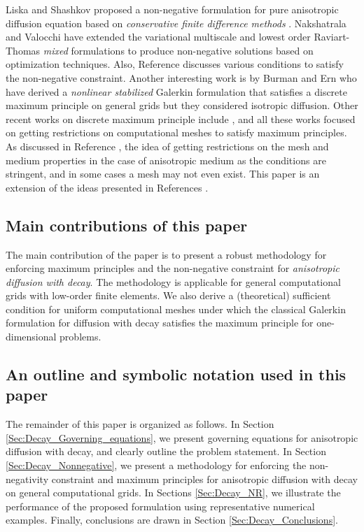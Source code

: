 \documentclass[11pt]{amsart}
\begin{document}
Liska and Shashkov \cite{Liska_Shashkov_CiCP_2008_v3_p852} proposed a non-negative formulation 
for pure anisotropic diffusion equation based on \emph{conservative finite difference methods} \cite{Shashkov}. 
Nakshatrala and Valocchi \cite{Nakshatrala_Valocchi_JCP_2009_v228_p6726} have extended the variational 
multiscale and lowest order Raviart-Thomas \emph{mixed} formulations to produce non-negative solutions 
based on optimization techniques. Also, Reference \cite[Appendix]{Nakshatrala_Valocchi_JCP_2009_v228_p6726} 
discusses various conditions to satisfy the non-negative constraint. Another interesting work is by Burman and 
Ern \cite{Burman_Ern_CRM_2004_v338_p641} who have derived a \emph{nonlinear stabilized} Galerkin 
formulation that satisfies a discrete maximum principle on general grids but they considered isotropic diffusion. 
Other recent works on discrete maximum principle include \cite{Korotov_Krizek_Neittaanmaki_MathComp_2000_v70_p107,
Vanselow_AppMath_2001_v46_p13,Karatson_Korotov_NumerMath_2005_v99_p669,
Karatson_Korotov_JCAM_2006_v192_p75}, and all these works 
focused on getting restrictions on computational meshes to satisfy maximum principles. As discussed 
in Reference \cite{Nakshatrala_Valocchi_JCP_2009_v228_p6726}, the idea of getting restrictions on 
the mesh and medium properties in the case of anisotropic medium as the conditions are stringent, 
and in some cases a mesh may not even exist. 
This paper is an extension of the ideas presented in References 
\cite{Nakshatrala_Valocchi_JCP_2009_v228_p6726,Liska_Shashkov_CiCP_2008_v3_p852}.

\subsection{Main contributions of this paper}
The main contribution of the paper is to present a robust methodology for enforcing 
maximum principles and the non-negative constraint for \emph{anisotropic diffusion 
with decay}. The methodology is applicable for general computational grids with low-order 
finite elements. We also derive a (theoretical) sufficient condition for uniform computational 
meshes under which the classical Galerkin formulation for diffusion with decay satisfies the 
maximum principle for one-dimensional problems. 

\subsection{An outline and symbolic notation used in this paper}
The remainder of this paper is organized as follows. In Section \ref{Sec:Decay_Governing_equations}, 
we present governing equations for anisotropic diffusion with decay, and clearly outline the problem 
statement. In Section \ref{Sec:Decay_Nonnegative}, we present a methodology for enforcing the 
non-negativity constraint and maximum principles for anisotropic diffusion with decay on general 
computational grids. In Sections \ref{Sec:Decay_NR}, we illustrate the performance of the proposed 
formulation using representative numerical examples. Finally, conclusions are drawn in Section 
\ref{Sec:Decay_Conclusions}.
\end{document}
